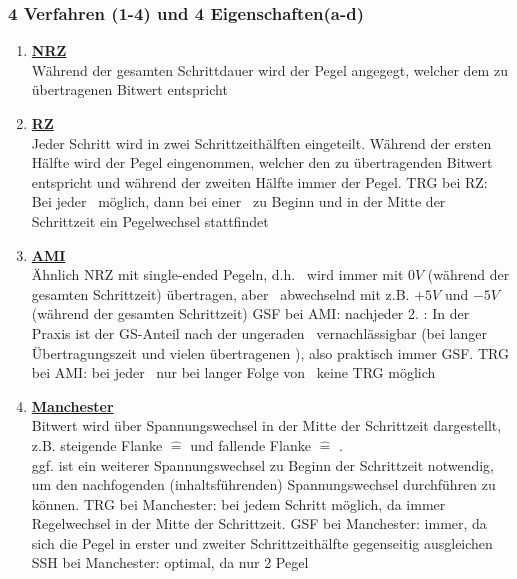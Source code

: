 \documentclass[10pt,a4paper]{scrartcl}
\begin{document}
\subsubsection*{4 Verfahren (1-4) und 4 Eigenschaften(a-d)}
\begin{enumerate}
	\item \textbf{\underline{\acf{NRZ}}}\\[0.5em]
	Während der gesamten Schrittdauer wird der Pegel angegegt, welcher dem zu übertragenen Bitwert entspricht
	\item \textbf{\underline{\acf{RZ}}}\\[0.5em]
	Jeder Schritt wird in zwei Schrittzeithälften eingeteilt. Während der ersten Hälfte wird der Pegel eingenommen, welcher den zu übertragenden Bitwert entspricht und während der zweiten Hälfte immer der \grqq\-Pegel.
	\subitem \ac{TRG} bei \ac{RZ}: Bei jeder \grqq\ möglich, dann bei einer \grqq\ zu Beginn und in der Mitte der Schrittzeit ein Pegelwechsel stattfindet
	\item \textbf{\underline{\acf{AMI}}} \\[0.5em]
	Ähnlich \ac{NRZ} mit single-ended Pegeln, d.h. \grqq\ wird immer mit $0V$ (während der gesamten Schrittzeit) übertragen, aber \grqq\ abwechselnd mit z.B. $+5V$ und $-5V$ (während der gesamten Schrittzeit)
	\subitem \ac{GSF} bei \ac{AMI}: nachjeder 2. \grqq: In der Praxis ist der GS-Anteil nach der ungeraden \grqq\ vernachlässigbar (bei langer Übertragungszeit und vielen übertragenen \grqq), also praktisch immer \ac{GSF}.
	\subitem \ac{TRG} bei \ac{AMI}: bei jeder \grqq\ nur bei langer Folge von \grqq\ keine \ac{TRG} möglich
	\item \textbf{\underline{Manchester}}\\
	Bitwert wird über Spannungswechsel in der Mitte der Schrittzeit dargestellt, z.B. steigende Flanke $\hat{=}$ \grqq{} und fallende Flanke $\hat{=}$ \grqq.\\
	ggf. ist ein weiterer Spannungswechsel zu Beginn der Schrittzeit notwendig, um den nachfogenden (inhaltsführenden) Spannungswechsel durchführen zu können.
	\subitem \ac{TRG} bei Manchester: bei jedem Schritt möglich, da immer Regelwechsel in der Mitte der Schrittzeit.
	\subitem \ac{GSF} bei Manchester: immer, da sich die Pegel in erster und zweiter Schrittzeithälfte gegenseitig ausgleichen
	\subitem \ac{SSH} bei Manchester: optimal, da \glqq nur\grqq{} 2 Pegel
\end{enumerate}
\end{document}
